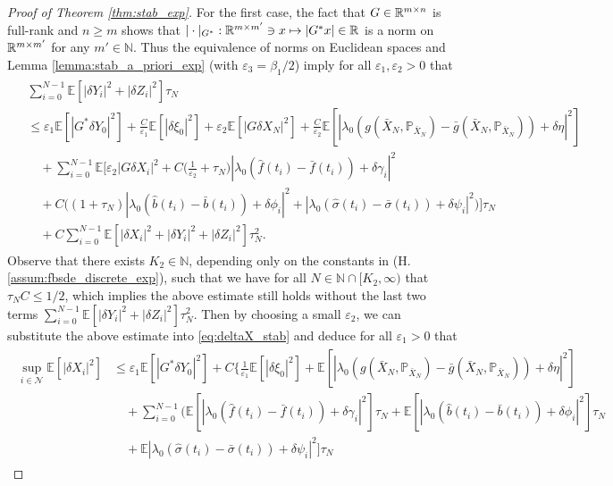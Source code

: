 \documentclass[11pt]{article}
\numberwithin{equation}{section}
\theoremstyle{definition}
\theoremstyle{remark}
\def\l{\label}  \def\f{\frac}  \def\fa{\forall}
\def\b{\beta}  \def\a{\alpha} \def\ga{\gamma}
\def\eps{\varepsilon}
\def\cN{\mathcal{N}}
\def\sE{{\mathbb{E}}}
\def\sN{{\mathbb{N}}}
\def\sP{\mathbb{P}}
\def\sR{{\mathbb R}}
\begin{document}
\begin{proof}[Proof of Theorem \ref{thm:stab_exp}]
For the first case, 
the fact that $G\in \sR^{m\t n}$ is full-rank
and $n\ge m$
shows that 
$|\cdot|_{G^*}: \sR^{m\t m'}\ni x\mapsto |G^*x|\in \sR $ is a norm on $\sR^{m\t m'}$ for any $m'\in \sN$.
Thus the equivalence of norms on Euclidean spaces
and Lemma  \ref{lemma:stab_a_priori_exp} (with $\eps_3={\b_1}/{2}$)
imply for all $\eps_1,\eps_2>0$  that
\begin{align*}
\begin{split}
& \sum_{i=0}^{N-1}
  \sE[
|\delta Y_{i}|^2+|\delta Z_i|^2 ]\tau_N
\\
& \le
\eps_1\sE[ |G^*\delta Y_0|^2]
+\frac{C}{\eps_1}\sE[ | \delta \xi_0|^2]
+
\eps_2
\sE[ |G\delta X_N|^2]
+
\frac{C}{\eps_2}\sE[ |\lambda_0(g(\bar{X}_N,\sP_{\bar{X}_N})-\bar{g}(\bar{X}_N,\sP_{\bar{X}_N}))
+\delta \eta|^2]
\\
&\quad
 +\sum_{i=0}^{N-1}
 \sE\bigg[
\eps_2 | G \delta X_i|^2
+C\bigg(\frac{1}{\eps_2}+\tau_N\bigg)
|
\lambda _0
(\hat{f}(t_{i})-\bar{f}(t_{i}))+\delta \gamma_i|^2
\\
& \quad
+
{C}
\bigg(
(1+\tau_N) |
 \lambda_0(
 \hat{b}(t_{i})-\bar{b}(t_{i}))+\delta \phi_{i}|^2
 +
 | 
 \lambda_0( \hat{\sigma}(t_i)-\bar{\sigma}(t_i))+\delta \psi_{i}|^2
 \bigg) \bigg]\tau_N
 \\
 &\quad
 +C\sum_{i=0}^{N-1}
 \sE[|  \delta X_i|^2+|\delta Y_{i}|^2+| \delta  {Z}_i|^2]\tau^2_N.
\end{split}
\end{align*}
Observe that there exists $K_2\in \sN$, depending only on the constants in (H.\ref{assum:fbsde_discrete_exp}),
such that  we have for all $N\in \sN\cap[K_2,\infty)$ that
$\tau_NC\le 1/2$, which implies 
the above estimate still holds 
without the last two terms 
$\sum_{i=0}^{N-1}
 \sE[|\delta Y_{i}|^2+| \delta  {Z}_i|^2]\tau^2_N$.
Then by choosing a small $\eps_2$, we can substitute the above estimate into \eqref{eq:deltaX_stab} 
and deduce  for all $\eps_1>0$ that
\begin{align}\l{eq:deltaX_senario1_withY0}
\begin{split}
\sup_{i\in \cN}\sE[|\delta X_{i}|^2]
&\le 
\eps_1\sE[ |G^*\delta Y_0|^2]
+C
\bigg\{
\frac{1}{\eps_1}\sE[|\delta \xi_{0}|^2]
+
\sE[ |\lambda_0(g(\bar{X}_N,\sP_{\bar{X}_N})-\bar{g}(\bar{X}_N,\sP_{\bar{X}_N}))
+\delta \eta|^2]
\\
&\quad
+\sum_{i=0}^{N-1}
\bigg(
\sE[|\lambda_0(\hat{f}(t_{i})-\bar{f}(t_{i}))+\delta \gamma_i|^2]\tau_N
+
\sE[|\lambda_0(\hat{b}(t_{i})-\bar{b}(t_{i}))+\delta \phi_{i}|^2]\tau_N
\\
&
\quad 
+
\sE|\lambda_0(\hat{\sigma}(t_i)-\bar{\sigma}(t_i))+\delta \psi_{i}|^2]\tau_N

\end{split}
\end{align}
\end{proof}
\end{document}
